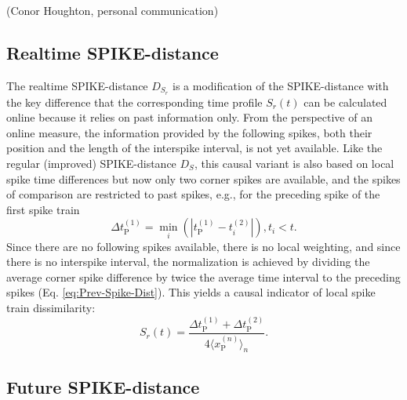 \documentclass[10pt,twocolumn]{elsart5p}
\begin{document}
(Conor Houghton, personal communication)


\subsection{\label{ss:Realtime-Spike-Distance} Realtime SPIKE-distance}

The realtime SPIKE-distance $D_{S_r}$ is a modification of the SPIKE-distance with the key difference that the corresponding time profile $S_r(t)$ can be calculated online because it relies on past information only. From the perspective of an online measure, the information provided by the following spikes, both their position and the length of the interspike interval, is not yet available. Like the regular (improved) SPIKE-distance $D_S$, this causal variant is also based on local spike time differences but now only two corner spikes are available, and the spikes of comparison are restricted to past spikes, e.g., for the preceding spike of the first spike train
%
\begin{equation} \label{eq:Delta-Corner-Spike-Realtime}
     \Delta t_{\mathrm {P}}^{(1)} = \min_i (| t_{\mathrm {P}}^{(1)} - t_i^{(2)} |), t_i < t.
\end{equation}
%
Since there are no following spikes available, there is no local weighting, and since there is no interspike interval, the normalization is achieved by dividing the average corner spike difference by twice the average time interval to the preceding spikes (Eq. \ref{eq:Prev-Spike-Dist}). This yields a causal indicator of local spike train dissimilarity:
%
\begin{equation} \label{eq:Bi-Spike-Diss-RT}
    S_r (t) = \frac{ \Delta t_{\mathrm {P}}^{(1)} + \Delta t_{\mathrm {P}}^{(2)}} {4 \langle x_{\mathrm {P}}^{(n)} \rangle_n}.
\end{equation}


\subsection{\label{ss:Future-Spike-Distance} Future SPIKE-distance}
\end{document}
